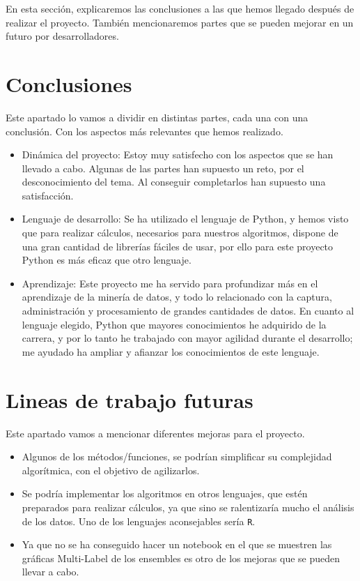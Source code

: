 
En esta sección, explicaremos las conclusiones a las que hemos llegado después de realizar el proyecto. También mencionaremos partes que se pueden mejorar en un futuro por desarrolladores. 

\section{Conclusiones}
Este apartado lo vamos a dividir en distintas partes, cada una con una conclusión. Con los aspectos más relevantes que hemos realizado.
\begin{itemize}
	\item Dinámica del proyecto: Estoy muy satisfecho con los aspectos que se han llevado a cabo. Algunas de las partes han supuesto un reto, por el desconocimiento del tema. Al conseguir completarlos han supuesto una satisfacción.
	\item Lenguaje de desarrollo: Se ha utilizado el lenguaje de Python, y hemos visto que para realizar cálculos, necesarios para nuestros algoritmos, dispone de una gran cantidad de librerías fáciles de usar, por ello para este proyecto Python es más eficaz que otro lenguaje.
	\item Aprendizaje: Este proyecto me ha servido para profundizar más en el aprendizaje de la minería de datos, y todo lo relacionado con la captura, administración y procesamiento de grandes cantidades de datos. En cuanto al lenguaje elegido, Python que mayores conocimientos he adquirido de la carrera, y por lo tanto he trabajado con mayor agilidad durante el desarrollo; me ayudado ha ampliar y afianzar los conocimientos de este lenguaje. 
\end{itemize}

\section{Lineas de trabajo futuras}
Este apartado vamos a mencionar diferentes mejoras para el proyecto.
\begin{itemize}
	\item Algunos de los métodos/funciones, se podrían simplificar su complejidad algorítmica, con el objetivo de agilizarlos.
	\item Se podría implementar los algoritmos en otros lenguajes, que estén preparados para realizar cálculos, ya que sino se ralentizaría mucho el análisis de los datos. Uno de los lenguajes aconsejables sería \texttt{R}.
	\item Ya que no se ha conseguido hacer un notebook en el que se muestren las gráficas Multi-Label de los ensembles es otro de los mejoras que se pueden llevar a cabo. 
\end{itemize}